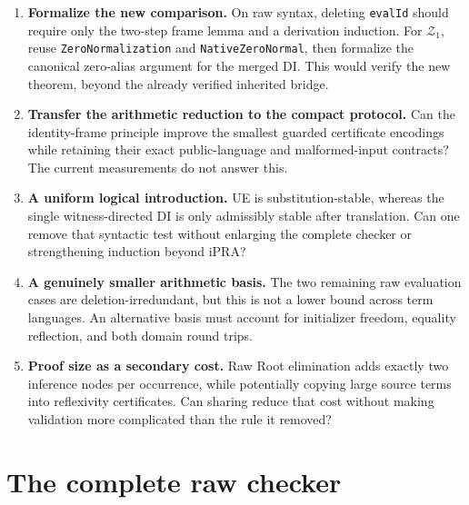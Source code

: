 \documentclass[11pt]{article}
\theoremstyle{definition}\newtheorem{definition}[theorem]{Definition}
\newcommand{\Zone}{\mathcal Z_1}
\begin{document}
\begin{enumerate}
\item \textbf{Formalize the new comparison.} On raw syntax, deleting
\texttt{evalId} should require only the two-step frame lemma and a
derivation induction. For $\Zone$, reuse \texttt{ZeroNormalization} and
\texttt{NativeZeroNormal}, then formalize the canonical zero-alias
argument for the merged DI. This would verify the new theorem, beyond
the already verified inherited bridge.
\item \textbf{Transfer the arithmetic reduction to the compact protocol.}
Can the identity-frame principle improve the smallest guarded
certificate encodings while retaining their exact public-language and
malformed-input contracts? The current measurements do not answer this.
\item \textbf{A uniform logical introduction.} UE is substitution-stable,
whereas the single witness-directed DI is only admissibly stable after
translation. Can one remove that syntactic test without enlarging the
complete checker or strengthening induction beyond iPRA?
\item \textbf{A genuinely smaller arithmetic basis.} The two remaining
raw evaluation cases are deletion-irredundant, but this is not a lower
bound across term languages. An alternative basis must account for
initializer freedom, equality reflection, and both domain round trips.
\item \textbf{Proof size as a secondary cost.} Raw Root elimination adds
exactly two inference nodes per occurrence, while potentially copying
large source terms into reflexivity certificates. Can sharing reduce
that cost without making validation more complicated than the rule it
removed?
\end{enumerate}

\appendix
\section{The complete raw checker}

\end{document}

